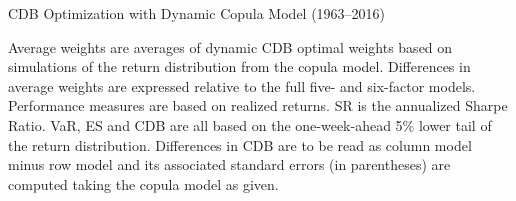 
\begin{table}
  \centering
  \footnotesize
  \renewcommand{\arraystretch}{1.2}

  \caption{CDB Optimization with Dynamic Copula Model (1963--2016)}

  \begin{longcaption}
    Average weights are averages of dynamic CDB optimal weights based on simulations of the return distribution from the copula model. Differences in average weights are expressed relative to the full five- and six-factor models. Performance measures are based on realized returns. SR is the annualized Sharpe Ratio. VaR, ES and CDB are all based on the one-week-ahead 5\% lower tail of the return distribution. Differences in CDB are to be read as column model minus row model and its associated standard errors (in parentheses) are computed taking the copula model as given.
  \end{longcaption}

  \label{tab:cdb_model}


\end{table}
